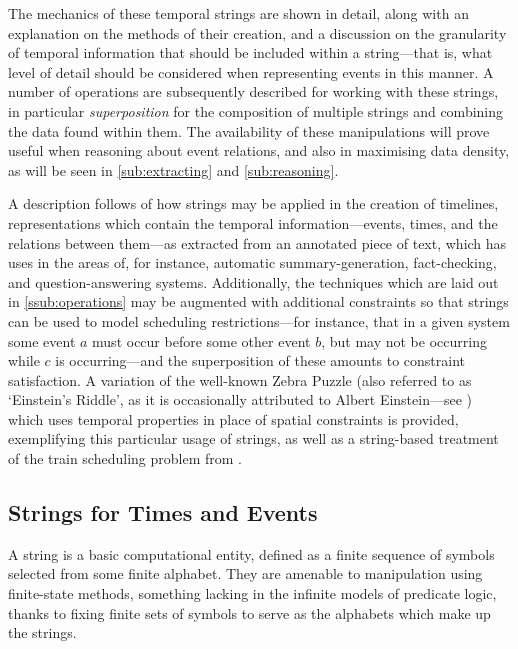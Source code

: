 \documentclass[a4paper,12pt,leqno,twoside]{article}
\begin{document}
The mechanics of these temporal strings are shown in detail, along with an explanation on the methods of their creation, and a discussion on the granularity of temporal information that should be included within a string---that is, what level of detail should be considered when representing events in this manner. A number of operations are subsequently described for working with these strings, in particular \textit{superposition} for the composition of multiple strings and combining the data found within them. The availability of these manipulations will prove useful when reasoning about event relations, and also in maximising data density, as will be seen in \cref{sub:extracting} and \cref{sub:reasoning}.

A description follows of how strings may be applied in the creation of timelines, representations which contain the temporal information---events, times, and the relations between them---as extracted from an annotated piece of text, which has uses in the areas of, for instance, automatic summary-generation, fact-checking, and question-answering systems. Additionally, the techniques which are laid out in \cref{ssub:operations} may be augmented with additional constraints so that strings can be used to model scheduling restrictions---for instance, that in a given system some event $a$ must occur before some other event $b$, but may not be occurring while $c$ is occurring---and the superposition of these amounts to constraint satisfaction. A variation of the well-known Zebra Puzzle (also referred to as `Einstein's Riddle', as it is occasionally attributed to Albert Einstein---see \citet[p. 10]{stangroom2009einstein}) which uses temporal properties in place of spatial constraints is provided, exemplifying this particular usage of strings, as well as a string-based treatment of the train scheduling problem from \citet{durand2008tool}.

\subsection{Strings for Times and Events}\label{sub:strings}
A string is a basic computational entity, defined as a finite sequence of symbols selected from some finite alphabet. They are amenable to manipulation using finite-state methods, something lacking in the infinite models of predicate logic, thanks to fixing finite sets of symbols to serve as the alphabets which make up the strings.
\end{document}
